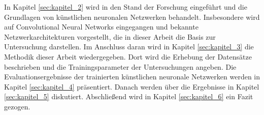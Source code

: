 In Kapitel \ref{sec:kapitel_2} wird in den Stand der Forschung eingeführt und die Grundlagen von künstlichen neuronalen Netzwerken behandelt. Insbesondere wird auf Convolutional Neural Networks eingegangen und bekannte Netzwerkarchitekturen vorgestellt, die in dieser Arbeit die Basis zur Untersuchung darstellen. Im Anschluss daran wird in Kapitel \ref{sec:kapitel_3} die Methodik dieser Arbeit wiedergegeben. Dort wird die Erhebung der Datensätze beschrieben und die Trainingsparameter der Untersuchungen angeben. Die Evaluationsergebnisse der trainierten künstlichen neuronale Netzwerken werden in Kapitel \ref{sec:kapitel_4} präsentiert. Danach werden über die Ergebnisse in Kapitel \ref{sec:kapitel_5} diskutiert. Abschließend wird in Kapitel \ref{sec:kapitel_6} ein Fazit gezogen. 



